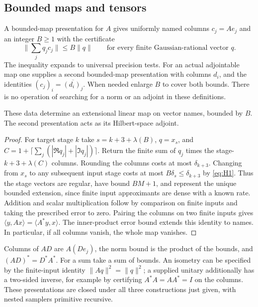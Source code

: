 \subsection{Bounded maps and tensors}

A bounded-map presentation for $A$ gives uniformly named columns
$c_j=Ae_j$ and an integer $B\ge1$ with the certificate
\[
 \Big\|\sum_j q_jc_j\Big\|\le B\|q\|
 \qquad\text{for every finite Gaussian-rational vector }q .
 \tag{H1}\label{eq:H1}
\]
The inequality expands to universal precision tests. For an actual
adjointable map one supplies a second bounded-map presentation with columns
$d_i$, and the identities $(c_j)_i=\overline{(d_i)_j}$.
When needed enlarge $B$ to cover both bounds. There is no operation
of searching for a norm or an adjoint in these definitions.

\begin{theorem}
These data determine an extensional linear map on vector names, bounded by
$B$. The second presentation acts as its Hilbert-space adjoint.
\end{theorem}
\begin{proof}
For target stage $k$ take $s=k+3+\lambda(B)$, $q=x_s$, and
$C=1+\lceil\sum_j(|\Re q_j|+|\Im q_j|)\rceil$. Return the finite sum
of $q_j$ times the stage-$k+3+\lambda(C)$ columns. Rounding the columns
costs at most $\delta_{k+3}$. Changing from $x_s$ to any subsequent
input stage costs at most $B\delta_s\le\delta_{k+3}$ by
\eqref{eq:H1}. Thus the stage vectors are regular, have bound $BM+1$,
and represent the unique bounded extension, since finite input approximants
are dense with a known rate. Addition and scalar multiplication follow by
comparison on finite inputs and taking the prescribed error to zero.
Pairing the columns on two finite inputs gives
$\langle y,Ax\rangle=\langle A^*y,x\rangle$.
The inner-product error bound extends this identity to names.
In particular, if all columns vanish, the whole map vanishes.
\end{proof}

Columns of $AD$ are $A(De_j)$, the norm bound is the product of the bounds,
and $(AD)^*=D^*A^*$. For a sum take a sum of bounds. An isometry can be
specified by the finite-input identity $\|Aq\|^2=\|q\|^2$; a supplied
unitary additionally has a two-sided inverse, for example by certifying
$A^*A=AA^*=I$ on the columns. These presentations are closed under all
three constructions just given, with nested samplers primitive recursive.

